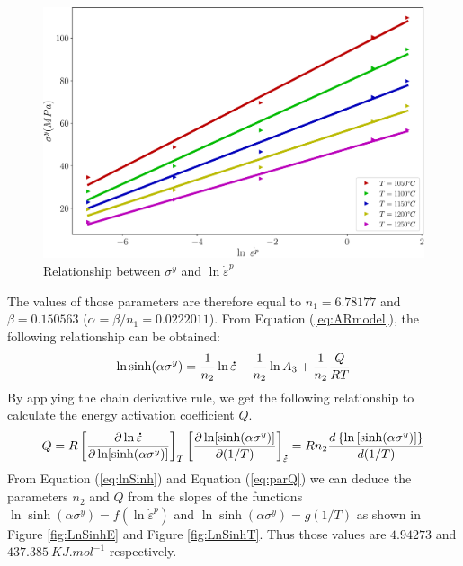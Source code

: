 \documentclass[twoside,english,1p,final,sort&compress]{elsarticle}
\theoremstyle{plain}
\newcommand{\mdot}[1]{\accentset{\mbox{\bfseries .}}{#1}}
\begin{document}
\begin{figure}[!ht]
\centering
\includegraphics[width=0.9\columnwidth]{Figures/LnSinhE0}
\caption{Relationship between $\sigma^y$ and $\ln \dot{\varepsilon}^p$}
\label{fig:LnSinhE0}
\end{figure}
The values of those parameters are therefore equal to $n_1=6.78177$ and $\beta=0.150563$ ($\alpha=\beta/n_1 = 0.0222011$).
From Equation (\ref{eq:ARmodel}), the following relationship can be obtained:
\begin{equation}
\label{eq:lnSinh}
\ln\sinh(\alpha\sigma^y) = \frac{1}{n_2}\ln \mdot\varepsilon  -  \frac{1}{n_2}\ln A_3 + \frac{1}{n_2} \frac{Q}{RT}
\end{equation}
By applying the chain derivative rule, we get the following relationship to calculate the energy activation coefficient $Q$.
\begin{equation}
\label{eq:parQ}
Q = R\left[\frac{\partial \ln \mdot\varepsilon}{\partial \ln [\sinh(\alpha\sigma^y)]}\right]_{T}\left[\frac{\partial \ln [\sinh(\alpha\sigma^y)]}{\partial (1/T)}\right]_{\mdot\varepsilon}= Rn_2\frac{d\left\{\ln\left[\sinh(\alpha\sigma^y)\right]\right\}}{d(1/T)}
\end{equation}
From Equation (\ref{eq:lnSinh}) and Equation (\ref{eq:parQ}) we can deduce the parameters $n_2 $ and $Q $ from the slopes of the functions $\ln \sinh(\alpha\sigma^y) = f(\ln \dot{\varepsilon}^p)$ and $\ln \sinh(\alpha\sigma^y) = g(1/T)$ as shown in Figure \ref{fig:LnSinhE} and Figure \ref{fig:LnSinhT}. Thus those values are $4.94273$ and $437.385\ KJ.mol^{-1}$ respectively.
\end{document}
